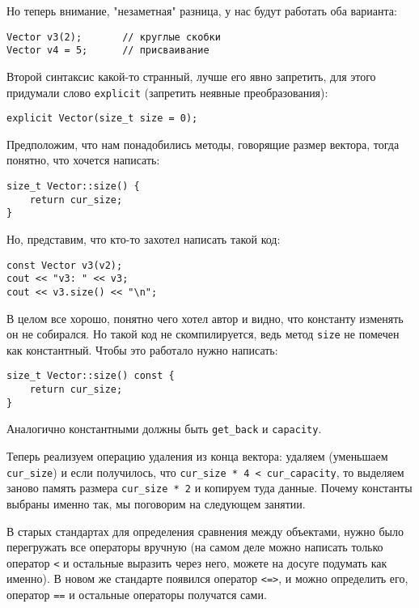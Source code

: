 Но теперь внимание, "незаметная" разница, у нас будут работать оба варианта:
\begin{verbatim}
Vector v3(2);       // круглые скобки
Vector v4 = 5;      // присваивание
\end{verbatim}

Второй синтаксис какой-то странный, лучше его явно запретить, для этого придумали слово \texttt{explicit} (запретить неявные преобразования):
\begin{verbatim}
explicit Vector(size_t size = 0);
\end{verbatim}


Предположим, что нам понадобились методы, говорящие размер вектора, тогда понятно, что хочется написать:

\begin{verbatim}
size_t Vector::size() {
    return cur_size;
}
\end{verbatim}

Но, представим, что кто-то захотел написать такой код:

\begin{verbatim}
const Vector v3(v2);
cout << "v3: " << v3;
cout << v3.size() << "\n";
\end{verbatim}

В целом все хорошо, понятно чего хотел автор и видно, что константу изменять он не собирался. Но такой код не скомпилируется, ведь метод \texttt{size} не помечен как константный. Чтобы это работало нужно написать:
\begin{verbatim}
size_t Vector::size() const {
    return cur_size;
}
\end{verbatim}

Аналогично константными должны быть \texttt{get_back} и \texttt{capacity}.

Теперь реализуем операцию удаления из конца вектора: удаляем (уменьшаем \texttt{cur_size}) и если получилось, что \texttt{cur_size * 4 < cur_capacity}, то выделяем заново память размера \texttt{cur_size * 2} и копируем туда данные. Почему константы выбраны именно так, мы поговорим на следующем занятии.


В старых стандартах для определения сравнения между объектами, нужно было перегружать все операторы вручную (на самом деле можно написать только оператор \texttt{<} и остальные выразить через него, можете на досуге подумать как именно). В новом же стандарте появился оператор \texttt{<=>}, и можно определить его, оператор \texttt{==} и остальные операторы получатся сами.

